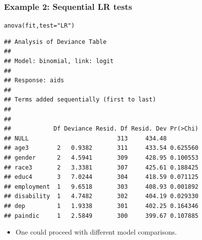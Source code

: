 \documentclass[extsize,handout,10pt]{beamer}\usepackage[]{graphicx}\usepackage[]{color}
\makeatletter
\newcommand{\hlstr}[1]{\textcolor[rgb]{1,0.4,0.2}{#1}}%
\newcommand{\hlstd}[1]{\textcolor[rgb]{0.251,0.251,0.251}{#1}}%
\newcommand{\hlkwc}[1]{\textcolor[rgb]{0.188,0.941,0.314}{#1}}%
\newcommand{\hlkwd}[1]{\textcolor[rgb]{0.69,0.188,0.941}{#1}}%
\newenvironment{kframe}{%
 \def\at@end@of@kframe{}%
 \ifinner\ifhmode%
  \def\at@end@of@kframe{\end{minipage}}%
  \begin{minipage}{\columnwidth}%
 \fi\fi%
 \def\FrameCommand##1{\hskip\@totalleftmargin \hskip-\fboxsep
 \colorbox{shadecolor}{##1}\hskip-\fboxsep
     \hskip-\linewidth \hskip-\@totalleftmargin \hskip\columnwidth}%
 \MakeFramed {\advance\hsize-\width
   \@totalleftmargin\z@ \linewidth\hsize
   \@setminipage}}%
 {\par\unskip\endMakeFramed%
 \at@end@of@kframe}
\newenvironment{knitrout}{}{} %
\makeatother
\begin{document}
\begin{frame}[fragile]
  \frametitle{Example 2: Sequential LR tests} 

\begin{knitrout}\tiny
{}\color{fgcolor}\begin{kframe}
\begin{alltt}
\hlkwd{anova}\hlstd{(fit,}\hlkwc{test}\hlstd{=}\hlstr{"LR"}\hlstd{)}
\end{alltt}
\begin{verbatim}
## Analysis of Deviance Table
## 
## Model: binomial, link: logit
## 
## Response: aids
## 
## Terms added sequentially (first to last)
## 
## 
##            Df Deviance Resid. Df Resid. Dev Pr(>Chi)
## NULL                         313     434.48         
## age3        2   0.9382       311     433.54 0.625560
## gender      2   4.5941       309     428.95 0.100553
## race3       2   3.3381       307     425.61 0.188425
## educ4       3   7.0244       304     418.59 0.071125
## employment  1   9.6518       303     408.93 0.001892
## disability  1   4.7482       302     404.19 0.029330
## dep         1   1.9338       301     402.25 0.164346
## paindic     1   2.5849       300     399.67 0.107885
\end{verbatim}
\end{kframe}
\end{knitrout}
 
\begin{itemize}
\item One could proceed with different model comparisons.
\end{itemize}

\end{frame}
\end{document}

